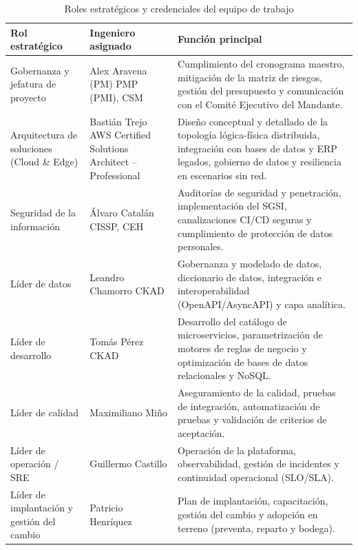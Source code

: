 \begin{table}[htbp]
\centering
\small
\caption{Roles estratégicos y credenciales del equipo de trabajo}
\label{tab:equipo}
\begin{tabularx}{\textwidth}{@{}L{4.6cm}L{4.6cm}X@{}}
\toprule
\textbf{Rol estratégico} & \textbf{Ingeniero asignado} & \textbf{Función principal} \\
\midrule
Gobernanza y jefatura de proyecto &
Alex Aravena (PM) \newline PMP (PMI), CSM &
Cumplimiento del cronograma maestro, mitigación de la matriz de riesgos, gestión del
presupuesto y comunicación con el Comité Ejecutivo del Mandante. \\
\addlinespace
Arquitectura de soluciones (Cloud \& Edge) &
Bastián Trejo \newline AWS Certified Solutions Architect -- Professional &
Diseño conceptual y detallado de la topología lógica-física distribuida, integración
con bases de datos y ERP legados, gobierno de datos y resiliencia en escenarios sin red. \\
\addlinespace
Seguridad de la información &
Álvaro Catalán \newline CISSP, CEH &
Auditorías de seguridad y penetración, implementación del SGSI, canalizaciones CI/CD
seguras y cumplimiento de protección de datos personales. \\
\addlinespace
Líder de datos &
Leandro Chamorro \newline CKAD &
Gobernanza y modelado de datos, diccionario de datos, integración e interoperabilidad
(OpenAPI/AsyncAPI) y capa analítica. \\
\addlinespace
Líder de desarrollo &
Tomás Pérez \newline CKAD &
Desarrollo del catálogo de microservicios, parametrización de motores de reglas de
negocio y optimización de bases de datos relacionales y NoSQL. \\
\addlinespace
Líder de calidad &
Maximiliano Miño \newline \pendiente{} &
Aseguramiento de la calidad, pruebas de integración, automatización de pruebas y
validación de criterios de aceptación. \\
\addlinespace
Líder de operación / SRE &
Guillermo Castillo \newline \pendiente{} &
Operación de la plataforma, observabilidad, gestión de incidentes y continuidad
operacional (SLO/SLA). \\
\addlinespace
Líder de implantación y gestión del cambio &
Patricio Henríquez \newline \pendiente{} &
Plan de implantación, capacitación, gestión del cambio y adopción en terreno
(preventa, reparto y bodega). \\
\bottomrule
\end{tabularx}
\end{table}
